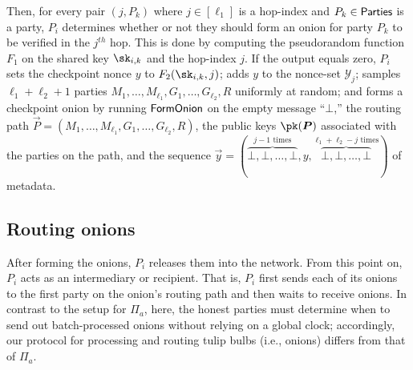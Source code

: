 \documentclass[runningheads,a4paper]{llncs}
\begin{document}
Then, for every pair $(j, P_k)$ where $j \in [\ell_1]$ is a hop-index and $P_k\in\mathsf{Parties}$ is a party, $P_i$ determines whether or not they should form an onion for party $P_k$ to be verified in the $j^{th}$ hop. 
This is done by computing the pseudorandom function $F_1$ on the shared key $\sk_{i, k}$ and the hop-index $j$. 
If the output equals zero, $P_i$ 
sets the checkpoint nonce $y$ to $ F_2(\sk_{i, k}, j)$; 
adds $y$ to the nonce-set $\mathcal{Y}_j$; 
samples $\ell_1+ \ell_2+1$ parties $M_{1}, \dots, M_{\ell_1}, G_{1}, \dots, G_{\ell_2}, R$ uniformly at random; and 
forms a checkpoint onion by running $\mathsf{FormOnion}$ on 
    the empty message ``$\bot$,'' 
    the routing path $\vec{P} = (M_{1}, \dots, M_{\ell_1}, G_{1}, \dots, G_{\ell_2}, R)$, 
    the public keys $\pk(\vec{P})$ associated with the parties on the path, and 
    the sequence $\vec{y} =(\overbrace{\bot, \bot, \dots, \bot}^{j-1 \text{ times}}, y, \overbrace{\bot, \bot, \dots, \bot}^{\ell_1+\ell_2-j \text{ times}})$ of metadata.
\iffalse
\begin{figure} [ht!]
\begin{pchstack} [center, boxed]
\pseudocode[linenumbering]{
\mathcal{Y}_1, \dots, \mathcal{Y}_{\ell_1} \gets \emptyset \\
\pcfor (j, P_k) \in [\ell_1] \times \parties: \\
\pcind \pcif F_1(\sk_{i, k}, j) = 0: \\
\pcind \pcind y \gets F_2(\sk_{i, k}, j) \\
\pcind \pcind \mathcal{Y}_j \gets \mathcal{Y}_j.\mathsf{append}(y) \\
\pcind \pcind \vec{y} = (\overbrace{\bot, \bot, \dots, \bot}^{j-1 \text{ times}}, y, \overbrace{\bot, \bot, \dots, \bot}^{\ell_1+\ell_2-j \text{ times}}) \\
\pcind \pcind M_{1}, \dots, M_{\ell_1}, G_{1}, \dots, G_{\ell_2}, R \sample \parties \\
\pcind \pcind \vec{O} \gets \formonion(\bot, (M_{1}, \dots, M_{\ell_1}, G_{1}, \dots, G_{\ell_2}, R), \pk(\vec{P}), \vec{y})  
}
\end{pchstack}
    \caption{\footnotesize{Pseudocode for forming checkpoint onions}}
    \label{fig:cpo}
\end{figure}
\fi

\subsection{Routing onions} \label{sec:proconions} 
After forming the onions, $P_i$ releases them into the network. From this point on, $P_i$ acts as an intermediary or recipient. 
That is, $P_i$ first sends each of its onions to the first party on the onion's routing path and then waits to receive onions. 
In contrast to the setup for $\Pi_a$, here, the honest parties must determine when to send out batch-processed onions without relying on a global clock; accordingly, our protocol for processing and routing tulip bulbs (i.e., onions) differs from that of $\Pi_a$.
\end{document}
